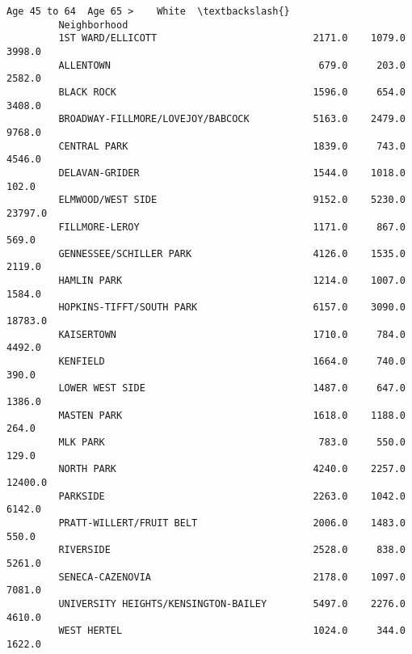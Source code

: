 \documentclass[11pt]{article}
\begin{document}
\begin{Verbatim}[commandchars=\\\{\}]
                                               Age 45 to 64  Age 65 >    White  \textbackslash{}
         Neighborhood                                                            
         1ST WARD/ELLICOTT                           2171.0    1079.0   3998.0   
         ALLENTOWN                                    679.0     203.0   2582.0   
         BLACK ROCK                                  1596.0     654.0   3408.0   
         BROADWAY-FILLMORE/LOVEJOY/BABCOCK           5163.0    2479.0   9768.0   
         CENTRAL PARK                                1839.0     743.0   4546.0   
         DELAVAN-GRIDER                              1544.0    1018.0    102.0   
         ELMWOOD/WEST SIDE                           9152.0    5230.0  23797.0   
         FILLMORE-LEROY                              1171.0     867.0    569.0   
         GENNESSEE/SCHILLER PARK                     4126.0    1535.0   2119.0   
         HAMLIN PARK                                 1214.0    1007.0   1584.0   
         HOPKINS-TIFFT/SOUTH PARK                    6157.0    3090.0  18783.0   
         KAISERTOWN                                  1710.0     784.0   4492.0   
         KENFIELD                                    1664.0     740.0    390.0   
         LOWER WEST SIDE                             1487.0     647.0   1386.0   
         MASTEN PARK                                 1618.0    1188.0    264.0   
         MLK PARK                                     783.0     550.0    129.0   
         NORTH PARK                                  4240.0    2257.0  12400.0   
         PARKSIDE                                    2263.0    1042.0   6142.0   
         PRATT-WILLERT/FRUIT BELT                    2006.0    1483.0    550.0   
         RIVERSIDE                                   2528.0     838.0   5261.0   
         SENECA-CAZENOVIA                            2178.0    1097.0   7081.0   
         UNIVERSITY HEIGHTS/KENSINGTON-BAILEY        5497.0    2276.0   4610.0   
         WEST HERTEL                                 1024.0     344.0   1622.0   
         

\end{Verbatim}
\end{document}
